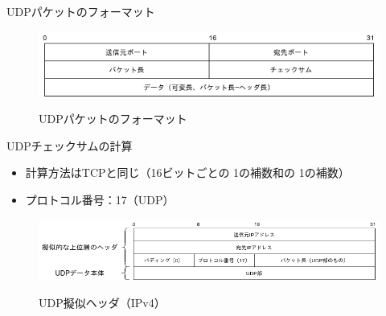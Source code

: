 \documentclass[12pt,aspectratio=169]{beamer}
\begin{document}
\begin{frame}{UDPパケットのフォーマット}


  \centering
  \begin{figure}
    \centering
    \includegraphics[width=12cm,bb=0 0 581 111]{./figures/udp_packet.png}
    \label{fig:udp_packet}
    \caption{UDPパケットのフォーマット}
  \end{figure}
\end{frame}


\begin{frame}{UDPチェックサムの計算}

  \begin{itemize}
    \item 計算方法はTCPと同じ（16ビットごとの 1の補数和の 1の補数）
    \item プロトコル番号：17（UDP）
  \end{itemize}

  \centering
  \begin{figure}
    \centering
    \includegraphics[width=12cm,bb=0 0 791 141]{./figures/udp_pseudo_header.png}
    \label{fig:udp_pseudo_header}
    \caption{UDP擬似ヘッダ（IPv4）}
  \end{figure}
\end{frame}
\end{document}
